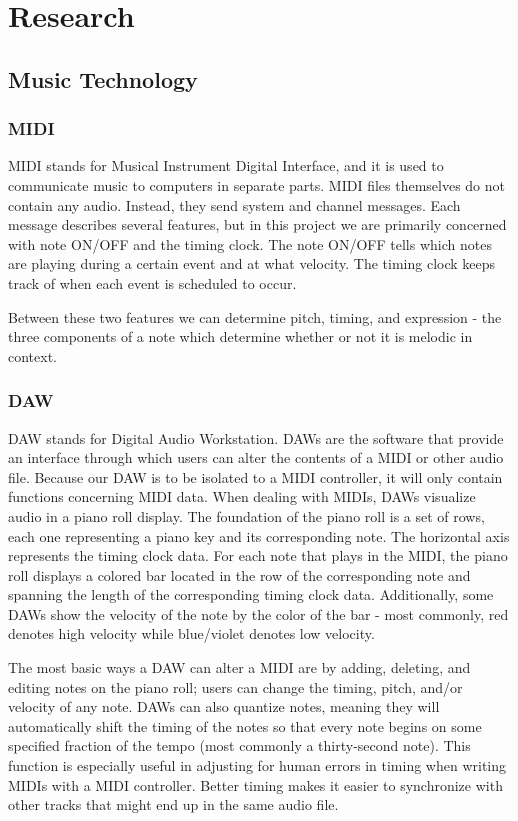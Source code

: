 \section{Research}

\subsection{Music Technology}

\subsubsection{MIDI}

MIDI stands for Musical Instrument Digital Interface, and it is used to communicate music
to computers in separate parts. MIDI files themselves do not contain any audio. Instead, they
send system and channel messages. Each message describes several features, but in this project
we are primarily concerned with note ON/OFF and the timing clock. The note ON/OFF tells which
notes are playing during a certain event and at what velocity. The timing clock keeps track of
when each event is scheduled to occur.

Between these two features we can determine pitch, timing, and expression - the three
components of a note which determine whether or not it is melodic in context.

\subsubsection{DAW}

DAW stands for Digital Audio Workstation. DAWs are the software that provide an interface
through which users can alter the contents of a MIDI or other audio file. Because our DAW is
to be isolated to a MIDI controller, it  will only contain functions concerning MIDI data.
When dealing with MIDIs, DAWs visualize audio in a piano roll display. The foundation of the
piano roll is a set of rows, each one representing a piano key and its corresponding note.
The horizontal axis represents the timing clock data. For each note that plays in the MIDI, the
piano roll displays a colored bar located in the row of the corresponding note and spanning the
length of the corresponding timing clock data. Additionally, some DAWs show the velocity of the
note by the color of the bar - most commonly, red denotes high velocity while blue/violet
denotes low velocity.

The most basic ways a DAW can alter a MIDI are by adding, deleting, and editing notes on the
piano roll; users can change the timing, pitch, and/or velocity of any note. DAWs can also
quantize notes, meaning they will automatically shift the timing of the notes so that every
note begins on some specified fraction of the tempo (most commonly a thirty-second note).
This function is especially useful in adjusting for human errors in timing when writing MIDIs
with a MIDI controller. Better timing makes it easier to synchronize with other tracks that might
end up in the same audio file.


